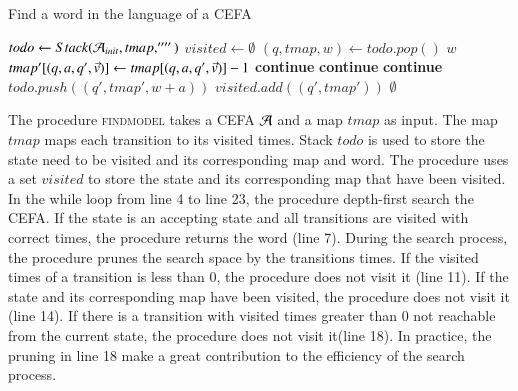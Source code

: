 \begin{algorithm}[H]
  \caption{Find a word in the language of a CEFA}\label{alg:findword}
  \begin{algorithmic}[1]
      \State $todo \gets Stack(\mathcal{A}_{init}, tmap, '''')$
      \State $visited \gets \emptyset$
        \State $(q, tmap, w) \gets todo.pop()$
          \State \Return $w$
        \EndIf
          \State $tmap'[(q, a, q', \vec{v})] \gets tmap[(q, a, q', \vec{v})] - 1$
            \State \textbf{continue}
          \EndIf
            \State \textbf{continue}
          \EndIf
            \State \textbf{continue}
          \EndIf
          \State $todo.push((q', tmap', w+a))$
          \State $visited.add((q', tmap'))$
        \EndFor
      \EndWhile
      \State \Return $\emptyset$ 
  \EndProcedure
  \end{algorithmic}
  \end{algorithm}

  The procedure \textsc{findmodel} takes a CEFA $\mathcal{A}$ and a map $tmap$ as input. The map $tmap$ maps each transition to its visited times. Stack $todo$ is used to store the state need to be visited and its corresponding map and word. The procedure uses a set $visited$ to store the state and its corresponding map that have been visited. In the while loop from line 4 to line 23, the procedure depth-first search the CEFA. If the state is an accepting state and all transitions are visited with correct times, the procedure returns the word (line 7). During the search process, the procedure prunes the search space by the transitions times. If the visited times of a transition is less than $0$, the procedure does not visit it (line 11). If the state and its corresponding map have been visited, the procedure does not visit it (line 14). If there is a transition with visited times greater than $0$ not reachable from the current state, the procedure does not visit it(line 18). In practice, the pruning in line 18 make a great contribution to the efficiency of the search process.